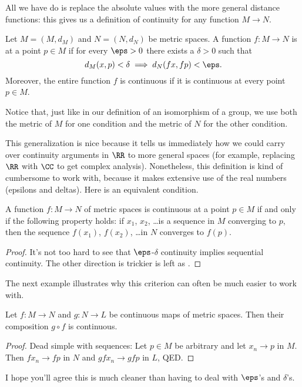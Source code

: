 All we have do is replace the absolute values with the more general distance functions: this gives us a definition of continuity for any function $M \to N$.

\begin{definition}
	Let $M = (M, d_M)$ and $N = (N, d_N)$ be metric spaces.
	A function $f : M \to N$ is  at a point $p \in M$
	if for every $\eps > 0$ there exists a $\delta > 0$ such that
	\[ d_M(x,p) < \delta \implies d_N(fx, fp) < \eps. \]
	Moreover, the entire function $f$ is continuous if it is continuous at every point $p \in M$.
\end{definition}
Notice that, just like in our definition of an isomorphism of a group,
we use both the metric of $M$ for one condition
and the metric of $N$ for the other condition.

This generalization is nice because it tells us immediately how we could carry over continuity arguments in $\RR$ to more general spaces (for example, replacing $\RR$ with $\CC$ to get complex analysis).
Nonetheless, this definition is kind of cumbersome to work with, because it makes extensive use of the real numbers (epsilons and deltas).
Here is an equivalent condition.
\begin{theorem}
	\label{thm:seq_cont}
	A function $f : M \to N$ of metric spaces is continuous at a point $p \in M$
	if and only if the following property holds:
	if $x_1$, $x_2$, \dots is a sequence in $M$ converging to $p$,
	then the sequence $f(x_1)$, $f(x_2)$, \dots in $N$ converges to $f(p)$.
\end{theorem}
\begin{proof}
	It's not too hard to see that $\eps$-$\delta$ continuity implies sequential continuity.
	The other direction is trickier is left as .
\end{proof}

The next example illustrates why this criterion can often be much easier to work with.
\begin{proposition}
	Let $f : M \to N$ and $g : N \to L$ be continuous maps of metric spaces.
	Then their composition $g \circ f$ is continuous.
\end{proposition}
\begin{proof}
	Dead simple with sequences:
	Let $p \in M$ be arbitrary and let $x_n \to p$ in $M$.
	Then $fx_n \to fp$ in $N$ and $gfx_n \to gfp$ in $L$, QED.
\end{proof}
I hope you'll agree this is much cleaner than having to deal with $\eps$'s and $\delta$'s.

